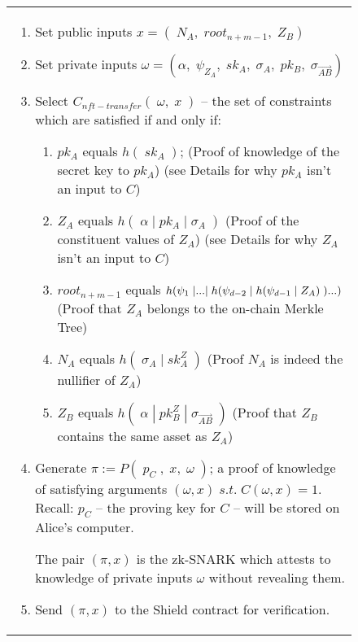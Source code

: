 \documentclass{article}
\DeclarePairedDelimiter\br{(}{)}
\begin{document}
\begin{figure}[H]
\begin{center}
\begin{framed}
\begin{tabular}{p{16cm}}
\begin{enumerate}
          \item Set public inputs $x = (\;N_A,\;root_{n+m-1},\;Z_B)$
          \item Set private inputs $\omega = (\alpha,\;\psi_{Z_A},\;sk_A,\;\sigma_{A},\;pk_B,\;\sigma_{\vec{AB}})$
          \item Select $C_{nft-transfer}(\;\omega,\;x\;)$ -- the set of constraints which are satisfied if and only if:
          \begin{enumerate}
            \item $pk_A$ equals $h(\;sk_A\;)$; (Proof of knowledge of the secret key to $pk_A$) (see Details for why $pk_A$ isn't an input to $C$)
            \item $Z_A$ equals $h(\;\alpha\;|\;pk_A\;|\;\sigma_A\;)$ (Proof of the constituent values of $Z_A$) (see Details for why $Z_A$ isn't an input to $C$)
            \item $root_{n+m-1}$ equals $h\br*{\psi_{1}\;|...|\;h\br*{\psi_{d-2}\;|\;h\br*{\psi_{d-1}\;|\;Z_A}\;}...}$ (Proof that $Z_A$ belongs to the on-chain Merkle Tree)
            \item $N_A$ equals $h(\;\sigma_{A}\;|\;sk^Z_A\;)$ (Proof $N_A$ is indeed the nullifier of $Z_A$)
            \item $Z_B$ equals $h(\;\alpha\;|\;pk^Z_B\;|\;\sigma_{\vec{AB}}\;)$ (Proof that $Z_B$ contains the same asset as $Z_A$)
          \end{enumerate}
          \item Generate $\pi := P(\;p_C\;,\;x,\;\omega\;)$; a proof of knowledge of satisfying arguments $(\omega, x)\;s.t.\;C(\omega, x) = 1$. Recall: $p_C$ -- the proving key for $C$ -- will be stored on Alice's computer.

          The pair $(\pi, x)$ is the zk-SNARK which attests to knowledge of private inputs $\omega$ without revealing them.
          \item Send $(\pi, x)$ to the Shield contract for verification.


\end{enumerate}
\end{tabular}
\end{framed}
\end{center}
\end{figure}
\end{document}
